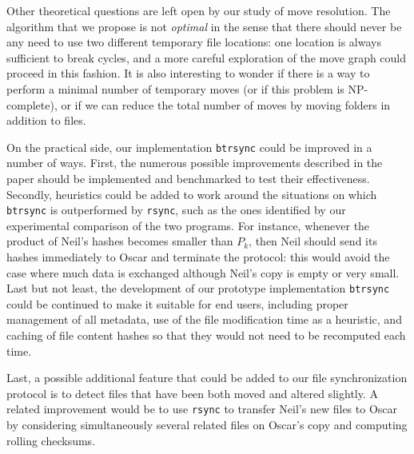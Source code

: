 \documentclass[twoside,envcountsame,runningheads]{llncs}
\newcommand{\btrsync}{\texttt{btrsync}\xspace}
\newcommand{\rsync}{\texttt{rsync}\xspace}
\begin{document}
Other theoretical questions are left open by our study of move resolution. The algorithm that we propose is not \emph{optimal} in the sense that there should never be any need to use two different temporary file locations: one location is always sufficient to break cycles, and a more careful exploration of the move graph could proceed in this fashion. It is also interesting to wonder if there is a way to perform a minimal number of temporary moves (or if this problem is NP-complete), or if we can reduce the total number of moves by moving folders in addition to files.

On the practical side, our implementation \btrsync could be improved in a number of ways. First, the numerous possible improvements described in the paper should be implemented and benchmarked to test their effectiveness. Secondly, heuristics could be added to work around the situations on which \btrsync is outperformed by \rsync, such as the ones identified by our experimental comparison of the two programs. For instance, whenever the product of Neil's hashes becomes smaller than $P_k$, then Neil should send its hashes immediately to Oscar and terminate the protocol: this would avoid the case where much data is exchanged although Neil's copy is empty or very small. Last but not least, the development of our prototype implementation \btrsync could be continued to make it suitable for end users, including proper management of all metadata, use of the file modification time as a heuristic, and caching of file content hashes so that they would not need to be recomputed each time.

Last, a possible additional feature that could be added to our file synchronization protocol is to detect files that have been both moved and altered slightly. A related improvement would be to use \rsync to transfer Neil's new files to Oscar by considering simultaneously several related files on Oscar's copy and computing rolling checksums.

\end{document}

